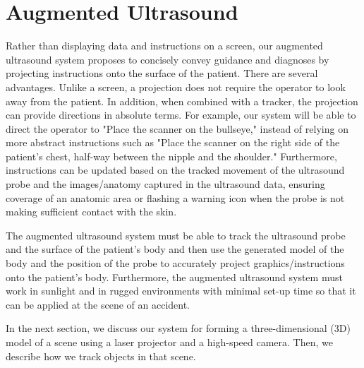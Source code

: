 \documentclass{llncs}
\begin{document}
\section{Augmented Ultrasound}
Rather than displaying data and instructions on a screen, our augmented ultrasound system proposes to concisely convey guidance and diagnoses by projecting instructions onto the surface of the patient. There are several advantages. Unlike a screen, a projection does not require the operator to look away from the patient. In addition, when combined with a tracker, the projection can provide directions in absolute terms. For example, our system will be able to direct the operator to "Place the scanner on the bullseye," instead of relying on more abstract instructions such as "Place the scanner on the right side of the patient's chest, half-way between the nipple and the shoulder." Furthermore, instructions can be updated based on the tracked movement of the ultrasound probe and the images/anatomy captured in the ultrasound data, ensuring coverage of an anatomic area or flashing a warning icon when the probe is not making sufficient contact with the skin.

The augmented ultrasound system must be able to track the ultrasound probe and the surface of the patient's body and then use the generated model of the body and the position of the probe to accurately project graphics/instructions onto the patient's body.  Furthermore, the augmented ultrasound system must work in sunlight and in rugged environments with minimal set-up time so that it can be applied at the scene of an accident.  

In the next section, we discuss our system for forming a three-dimensional (3D) model of a scene using a laser projector and a high-speed camera. Then, we describe how we track objects in that scene.
\end{document}
